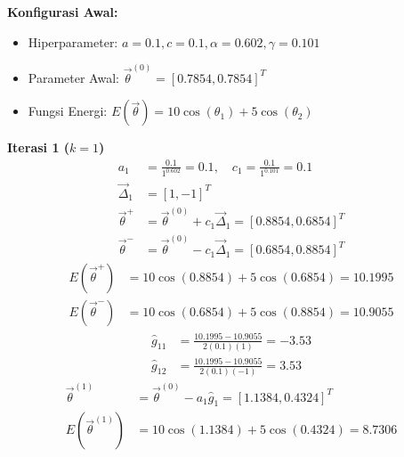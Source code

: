 \textbf{Konfigurasi Awal:}
\begin{itemize}
    \item Hiperparameter: $a = 0.1, c = 0.1, \alpha = 0.602, \gamma = 0.101$
    \item Parameter Awal: $\vec{\theta}^{(0)} = [0.7854, 0.7854]^T$
    \item Fungsi Energi: $E(\vec{\theta}) = 10 \cos(\theta_1) + 5 \cos(\theta_2)$
\end{itemize}

\textbf{Iterasi 1 ($k=1$)}
\begin{align}
    a_1 &= \frac{0.1}{1^{0.602}} = 0.1, \quad c_1 = \frac{0.1}{1^{0.101}} = 0.1 \\
    \vec{\Delta}_1 &= [1, -1]^T \\
    \vec{\theta}^+ &= \vec{\theta}^{(0)} + c_1 \vec{\Delta}_1 = [0.8854, 0.6854]^T \\
    \vec{\theta}^- &= \vec{\theta}^{(0)} - c_1 \vec{\Delta}_1 = [0.6854, 0.8854]^T
\end{align}
\begin{align}
    E(\vec{\theta}^+) &= 10 \cos(0.8854) + 5 \cos(0.6854) = 10.1995 \\
    E(\vec{\theta}^-) &= 10 \cos(0.6854) + 5 \cos(0.8854) = 10.9055
\end{align}
\begin{align}
    \hat{g}_{11} &= \frac{10.1995 - 10.9055}{2(0.1)(1)} = -3.53 \\
    \hat{g}_{12} &= \frac{10.1995 - 10.9055}{2(0.1)(-1)} = 3.53
\end{align}
\begin{align}
    \vec{\theta}^{(1)} &= \vec{\theta}^{(0)} - a_1 \hat{g}_1 = [1.1384, 0.4324]^T \\
    E(\vec{\theta}^{(1)}) &= 10 \cos(1.1384) + 5 \cos(0.4324) = 8.7306
\end{align}

